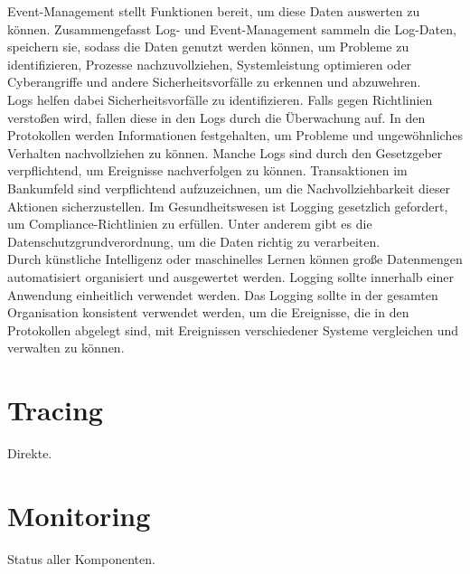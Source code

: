 Event-Management stellt Funktionen bereit, um diese Daten auswerten zu können.
Zusammengefasst Log- und Event-Management sammeln die Log-Daten, speichern sie, sodass die Daten genutzt werden können, um Probleme zu identifizieren, Prozesse nachzuvollziehen, Systemleistung optimieren oder Cyberangriffe und andere Sicherheitsvorfälle zu erkennen und abzuwehren.
\\
Logs helfen dabei Sicherheitsvorfälle zu identifizieren.
Falls gegen Richtlinien verstoßen wird, fallen diese in den Logs durch die Überwachung auf.
In den Protokollen werden Informationen festgehalten, um Probleme und ungewöhnliches Verhalten nachvollziehen zu können.
Manche Logs sind durch den Gesetzgeber verpflichtend, um Ereignisse nachverfolgen zu können.
Transaktionen im Bankumfeld sind verpflichtend aufzuzeichnen, um die Nachvollziehbarkeit dieser Aktionen sicherzustellen.
Im Gesundheitswesen ist Logging gesetzlich gefordert, um Compliance-Richtlinien zu erfüllen.
Unter anderem gibt es die Datenschutzgrundverordnung, um die Daten richtig zu verarbeiten.
\\
Durch künstliche Intelligenz oder maschinelles Lernen können große Datenmengen automatisiert organisiert und ausgewertet werden.
Logging sollte innerhalb einer Anwendung einheitlich verwendet werden.
Das Logging sollte in der gesamten Organisation konsistent verwendet werden, um die Ereignisse, die in den Protokollen abgelegt sind, mit Ereignissen verschiedener Systeme vergleichen und verwalten zu können.
\\
\autocite{ip-insider, ait, owasp}


\section{Tracing}\label{sec:tracing}
Direkte.\autocite{adesso, monstarlab}


\section{Monitoring}\label{sec:monitoring}
Status aller Komponenten.\autocite{cloudradar, wbs, crossmedia}

